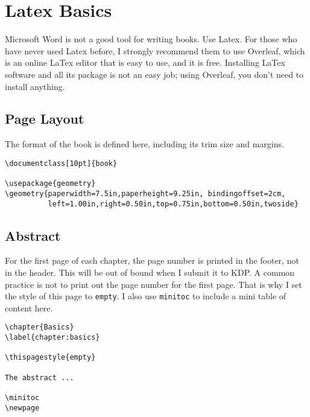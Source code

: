 

\chapter{Latex Basics}
\label{chapter:basics}

\thispagestyle{empty}


Microsoft Word is not a good tool for writing books. Use Latex. 
For those who have never used Latex before, I strongly recommend 
them to use Overleaf, which is an online LaTex editor that is easy to use,
and it is free. Installing LaTex software and all its package is not 
an easy job; using Overleaf, you don't need to install anything. 


\minitoc
\newpage



\section{Page Layout} 

The format of the book is defined here, including its trim size and 
margins. 


\begin{lstlisting}
\documentclass[10pt]{book}

\usepackage{geometry}
\geometry{paperwidth=7.5in,paperheight=9.25in, bindingoffset=2cm,
          left=1.00in,right=0.50in,top=0.75in,bottom=0.50in,twoside}
\end{lstlisting}
 


\section{Abstract}
\label{basics:abstract}

For the first page of each chapter, the page number is printed in the footer, not
in the header. This will be out of bound when I submit it to KDP. 
A common practice is not to print out the page number for the first page.
That is why I set the style of this page to \texttt{empty}. 
I also use \texttt{minitoc} to include a mini table of content 
here. 

\begin{lstlisting}
\chapter{Basics}
\label{chapter:basics}

\thispagestyle{empty}

The abstract ...

\minitoc
\newpage
\end{lstlisting}



